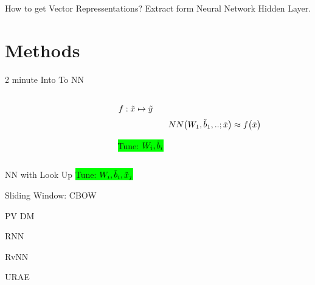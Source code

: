 \documentclass[12pt,landscape,english]{beamer}
\begin{document}

\begin{frame} {How to get Vector Repressentations?} 
	Extract form Neural Network Hidden Layer.
\end{frame}


\section{Methods}
\begin{frame} {2 minute Into To NN}
	\begin{columns} 
	\begin{column}{0.5\textwidth}
		\center
	\end{column}
	\begin{column}{0.5\textwidth}
	
			$f:\tilde{x}\mapsto\tilde{y}$
			$$NN\big(W_1,\tilde{b}_1,..;\tilde{x}\big)\approx f \big(\tilde{x}\big)$$

		\colorbox{lime}{Tune:	$W_i,\tilde{b}_i$}

	\end{column}
	\end{columns}
\end{frame}

\begin{frame} {NN with Look Up}
	\center
	\colorbox{lime}{Tune:	$W_i,\tilde{b}_i,\tilde{x}_j$}

\end{frame}


\begin{frame} {Sliding Window: CBOW} 
	
\end{frame}

\begin{frame} {PV DM} 
	
\end{frame}

\begin{frame} {RNN} 
	
\end{frame}

\begin{frame} {RvNN} 
	
\end{frame}

\begin{frame} {URAE} 
	
\end{frame}
\end{document}
